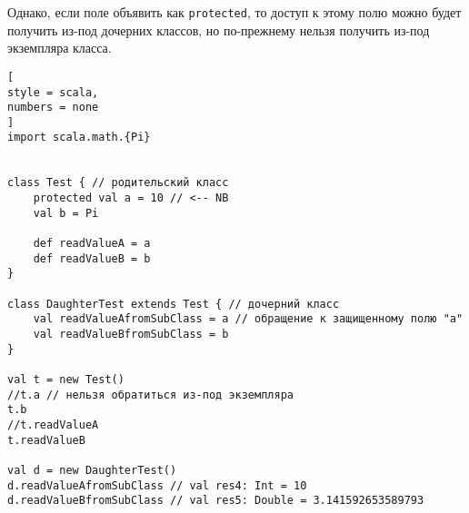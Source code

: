\documentclass[%
	11pt,
	a4paper,
	utf8,
		]{article}
\begin{document}
Однако, если поле объявить как \texttt{protected}, то доступ к этому полю можно будет получить из-под дочерних классов, но по-прежнему нельзя получить из-под экземпляра класса.
\begin{lstlisting}[
style = scala,
numbers = none	
]
import scala.math.{Pi}


class Test { // родительский класс
	protected val a = 10 // <-- NB
	val b = Pi
	
	def readValueA = a
	def readValueB = b
}

class DaughterTest extends Test { // дочерний класс
	val readValueAfromSubClass = a // обращение к защищенному полю "a"
	val readValueBfromSubClass = b
}

val t = new Test()
//t.a // нельзя обратиться из-под экземпляра
t.b
//t.readValueA
t.readValueB

val d = new DaughterTest()
d.readValueAfromSubClass // val res4: Int = 10
d.readValueBfromSubClass // val res5: Double = 3.141592653589793
\end{lstlisting}




\begin{thebibliography}{99}
\end{thebibliography}
\end{document}
